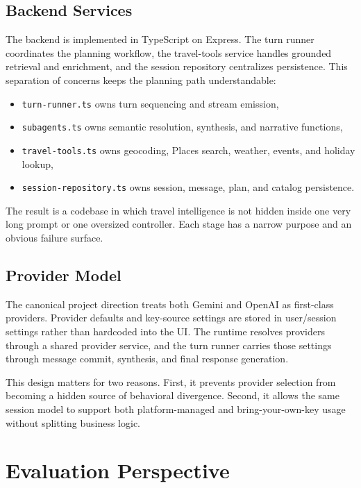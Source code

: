 \documentclass[conference]{IEEEtran}
\begin{document}
\subsection{Backend Services}

The backend is implemented in TypeScript on Express. The turn runner coordinates the planning workflow, the travel-tools service handles grounded retrieval and enrichment, and the session repository centralizes persistence. This separation of concerns keeps the planning path understandable:

\begin{itemize}
  \item \texttt{turn-runner.ts} owns turn sequencing and stream emission,
  \item \texttt{subagents.ts} owns semantic resolution, synthesis, and narrative functions,
  \item \texttt{travel-tools.ts} owns geocoding, Places search, weather, events, and holiday lookup,
  \item \texttt{session-repository.ts} owns session, message, plan, and catalog persistence.
\end{itemize}

The result is a codebase in which travel intelligence is not hidden inside one very long prompt or one oversized controller. Each stage has a narrow purpose and an obvious failure surface.

\subsection{Provider Model}

The canonical project direction treats both Gemini and OpenAI as first-class providers. Provider defaults and key-source settings are stored in user/session settings rather than hardcoded into the UI. The runtime resolves providers through a shared provider service, and the turn runner carries those settings through message commit, synthesis, and final response generation.

This design matters for two reasons. First, it prevents provider selection from becoming a hidden source of behavioral divergence. Second, it allows the same session model to support both platform-managed and bring-your-own-key usage without splitting business logic.

\section{Evaluation Perspective}
\end{document}

